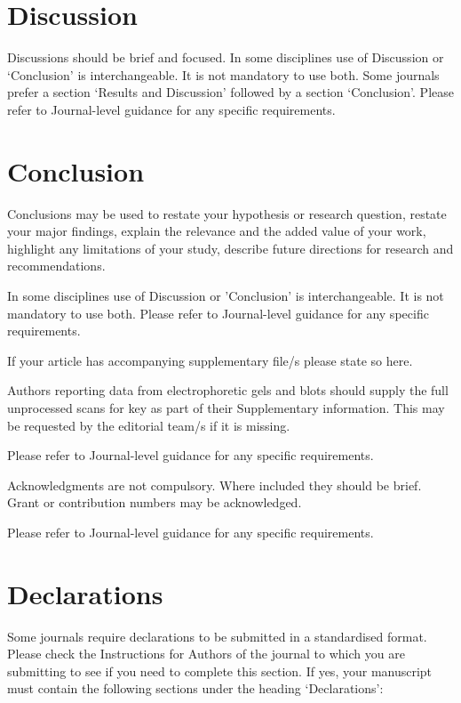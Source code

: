 \documentclass[sn-mathphys]{sn-jnl}%
\theoremstyle{thmstyleone}%
\theoremstyle{thmstyletwo}%
\theoremstyle{thmstylethree}%
\begin{document}
\section{Discussion}\label{sec12}

Discussions should be brief and focused. In some disciplines use of Discussion or `Conclusion' is interchangeable. It is not mandatory to use both. Some journals prefer a section `Results and Discussion' followed by a section `Conclusion'. Please refer to Journal-level guidance for any specific requirements. 

\section{Conclusion}\label{sec13}

Conclusions may be used to restate your hypothesis or research question, restate your major findings, explain the relevance and the added value of your work, highlight any limitations of your study, describe future directions for research and recommendations. 

In some disciplines use of Discussion or 'Conclusion' is interchangeable. It is not mandatory to use both. Please refer to Journal-level guidance for any specific requirements. 

\backmatter


If your article has accompanying supplementary file/s please state so here. 

Authors reporting data from electrophoretic gels and blots should supply the full unprocessed scans for key as part of their Supplementary information. This may be requested by the editorial team/s if it is missing.

Please refer to Journal-level guidance for any specific requirements.


Acknowledgments are not compulsory. Where included they should be brief. Grant or contribution numbers may be acknowledged.

Please refer to Journal-level guidance for any specific requirements.

\section*{Declarations}

Some journals require declarations to be submitted in a standardised format. Please check the Instructions for Authors of the journal to which you are submitting to see if you need to complete this section. If yes, your manuscript must contain the following sections under the heading `Declarations':
\end{document}
